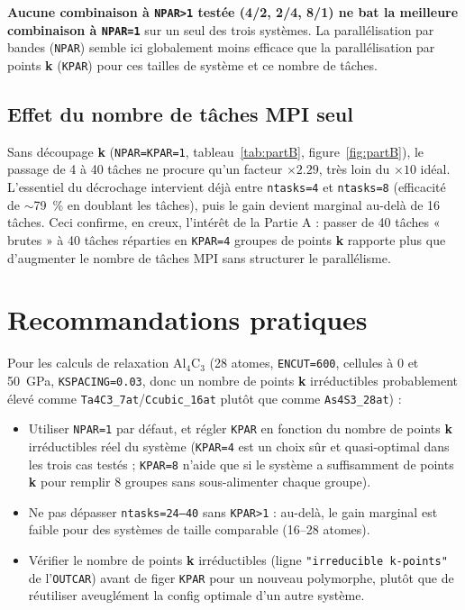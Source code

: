 \documentclass[11pt,a4paper]{article}
\begin{document}
\textbf{Aucune combinaison à \texttt{NPAR>1} testée (4/2, 2/4, 8/1) ne bat la meilleure
combinaison à \texttt{NPAR=1}} sur un seul des trois systèmes. La parallélisation par bandes
(\texttt{NPAR}) semble ici globalement moins efficace que la parallélisation par points
\textbf{k} (\texttt{KPAR}) pour ces tailles de système et ce nombre de tâches.

\subsection{Effet du nombre de tâches MPI seul}

Sans découpage \textbf{k} (\texttt{NPAR=KPAR=1}, tableau~\ref{tab:partB},
figure~\ref{fig:partB}), le passage de 4 à 40 tâches ne procure qu'un facteur $\times2.29$, très
loin du $\times10$ idéal. L'essentiel du décrochage intervient déjà entre \texttt{ntasks=4} et
\texttt{ntasks=8} (efficacité de $\sim$79~\% en doublant les tâches), puis le gain devient marginal
au-delà de 16 tâches. Ceci confirme, en creux, l'intérêt de la Partie A : passer de 40 tâches
« brutes » à 40 tâches réparties en \texttt{KPAR=4} groupes de points \textbf{k} rapporte plus
que d'augmenter le nombre de tâches MPI sans structurer le parallélisme.

\section{Recommandations pratiques}

Pour les calculs de relaxation Al$_4$C$_3$ (28 atomes, \texttt{ENCUT=600}, cellules à 0 et
50~GPa, \texttt{KSPACING=0.03}, donc un nombre de points \textbf{k} irréductibles probablement
élevé comme \texttt{Ta4C3\_7at}/\texttt{Ccubic\_16at} plutôt que comme
\texttt{As4S3\_28at}) :

\begin{itemize}
  \item Utiliser \texttt{NPAR=1} par défaut, et régler \texttt{KPAR} en fonction du nombre de
  points \textbf{k} irréductibles réel du système (\texttt{KPAR=4} est un choix sûr et
  quasi-optimal dans les trois cas testés ; \texttt{KPAR=8} n'aide que si le système a
  suffisamment de points \textbf{k} pour remplir 8 groupes sans sous-alimenter chaque groupe).
  \item Ne pas dépasser \texttt{ntasks=24--40} sans \texttt{KPAR>1} : au-delà, le gain marginal
  est faible pour des systèmes de taille comparable (16--28 atomes).
  \item Vérifier le nombre de points \textbf{k} irréductibles (ligne \texttt{"irreducible
  k-points"} de l'\texttt{OUTCAR}) avant de figer \texttt{KPAR} pour un nouveau polymorphe, plutôt
  que de réutiliser aveuglément la config optimale d'un autre système.
\end{itemize}
\end{document}
